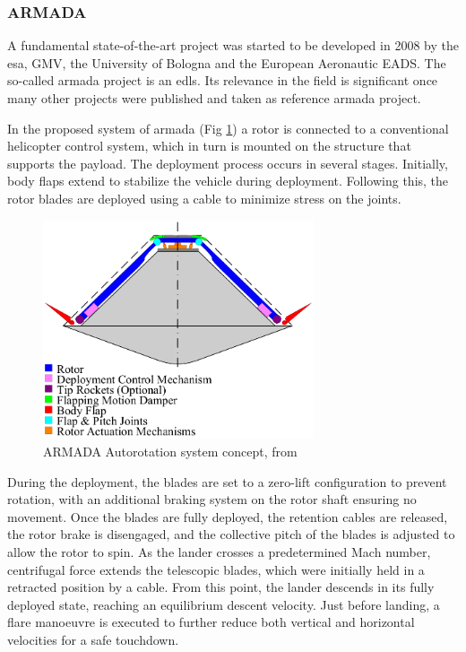 \subsubsection{ARMADA}

A fundamental state-of-the-art project was started to be developed in 2008  by the \gls{esa}, GMV, the University of Bologna and the European Aeronautic \gls{EADS}. The so-called \gls{armada} project \cite{noauthor_armada_nodate} is an \gls{edls}. Its relevance in the field is significant once many other projects were published and taken as reference \gls{armada} project. 

 In the proposed system of \gls{armada} (Fig \ref{fig:armada_concept}) a rotor is connected to a conventional helicopter control system, which in turn is mounted on the structure that supports the payload. The deployment process occurs in several stages. Initially, body flaps extend to stabilize the vehicle during deployment. Following this, the rotor blades are deployed using a cable to minimize stress on the joints. 

\begin{figure}[!htb]
    \centering
    \includegraphics[width=8cm]{Figures/introduction/armada_concept_vehicle.png}
    \caption{ARMADA Autorotation system concept, from \cite{noauthor_armada_nodate} }
    \label{fig:armada_concept}
\end{figure}

During the deployment, the blades are set to a zero-lift configuration to prevent rotation, with an additional braking system on the rotor shaft ensuring no movement. Once the blades are fully deployed, the retention cables are released, the rotor brake is disengaged, and the collective pitch of the blades is adjusted to allow the rotor to spin. As the lander crosses a predetermined Mach number, centrifugal force extends the telescopic blades, which were initially held in a retracted position by a cable. From this point, the lander descends in its fully deployed state, reaching an equilibrium descent velocity. Just before landing, a flare manoeuvre is executed to further reduce both vertical and horizontal velocities for a safe touchdown.

